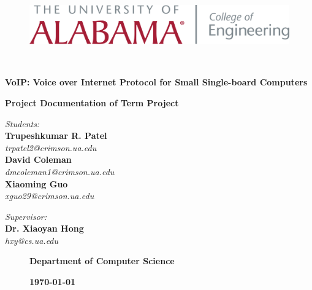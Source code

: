 \begin{titlepage}
	\begin{figure}[t]
		\begin{minipage}{\textwidth}
			\centering
			\includegraphics[scale=0.35]{Images/UA/OfficLogo-Engineering.png}
		\end{minipage}
	\end{figure}

	\quad\\
	\vspace{0.5in}
	\centering
	\begin{spacing}{2.0}
		{ \textbf{\LARGE VoIP: Voice over Internet Protocol for Small Single-board Computers}}
	\end{spacing}
	
	\vspace{1.5in}
	\textbf{\Large Project Documentation of Term Project}
	\vspace{3.0in}

	\begin{minipage}{0.49\textwidth}
		\begin{flushleft}
			\textit{{Students:}} \\
			{\textbf{Trupeshkumar R. Patel}}\\
			\textsl{trpatel2@crimson.ua.edu}\\
			{\textbf{David Coleman}}\\
			\textsl{dmcoleman1@crimson.ua.edu}\\
			{\textbf{Xiaoming Guo}}\\
			\textsl{xguo29@crimson.ua.edu}
		\end{flushleft}
	\end{minipage}
	\begin{minipage}{0.5\textwidth}
		\begin{flushright}
			\textit{{Supervisor:}} \\
			{\textbf{Dr. Xiaoyan Hong}}\\
			\textsl{hxy@cs.ua.edu}
		\end{flushright}
	\end{minipage}

	\begin{figure}[b]
		\begin{minipage}{0.55\textwidth}
			\begin{flushleft}
				\textbf{\large Department of Computer Science}
			\end{flushleft}
		\end{minipage}
		\hfill
		\begin{minipage}{0.35\textwidth}
			\begin{flushright}
				\textsc{\textbf{\today}}
			\end{flushright}
		\end{minipage}
	\end{figure}

\end{titlepage}